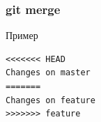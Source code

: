 \documentclass[pdf,russian]{beamer}
\begin{document}
\begin{frame}[fragile]
    \frametitle{git merge}
    \pause
    \begin{exampleblock}{Пример}
        \begin{Verbatim}
<<<<<<< HEAD
Changes on master
=======
Changes on feature
>>>>>>> feature
        \end{Verbatim}
    \end{exampleblock}
\end{frame}
\end{document}
